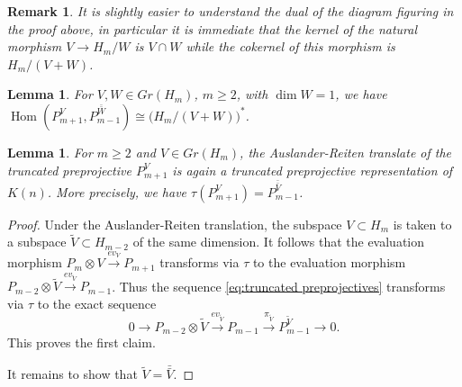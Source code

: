 \documentclass{amsart}
\newtheorem{lemma}[theorem]{Lemma}
\newtheorem{remark}[theorem]{Remark}
\newcommand{\Hom}{\operatorname{Hom}}
\begin{document}
\begin{remark}
  It is slightly easier to understand the dual of the diagram figuring in the proof above, in particular it is immediate that the kernel of the natural morphism $V\to H_m/W$ is $V\cap W$ while the cokernel of this morphism is $H_m/(V+W)$.
\end{remark}

\begin{lemma}
  For $V,W\in Gr(H_m)$, $m\ge2$, with $\dim W=1$, we have $\Hom(P_{m+1}^V,P_{m-1}^{\bar{\bar{W}}})\cong\big(H_m/(V+W)\big)^*$.
\end{lemma}

\begin{lemma}
  For $m\ge2$ and $V\in Gr(H_m)$, the Auslander-Reiten translate of the truncated preprojective $P_{m+1}^V$ is again a truncated preprojective representation of $K(n)$.  More precisely, we have $\tau(P_{m+1}^V)=P_{m-1}^{\bar{\bar{V}}}$.
\end{lemma}
\begin{proof}
  Under the Auslander-Reiten translation, the subspace $V\subset H_m$ is taken to a subspace $\tilde V\subset H_{m-2}$ of the same dimension.
  It follows that the evaluation morphism $P_m\otimes V\stackrel{ev_V}{\longrightarrow} P_{m+1}$ transforms via $\tau$ to the evaluation morphism $P_{m-2}\otimes\tilde V\stackrel{ev_{\tilde V}}{\longrightarrow} P_{m-1}$.
  Thus the sequence \eqref{eq:truncated preprojectives} transforms via $\tau$ to the exact sequence
  \[0\longrightarrow P_{m-2}\otimes \tilde V\stackrel{ev_{\tilde V}}{\longrightarrow} P_{m-1}\stackrel{\pi_{\tilde V}}{\longrightarrow} P_{m-1}^{\tilde V}\longrightarrow 0.\]
  This proves the first claim.

  It remains to show that $\tilde V=\bar{\bar{V}}$.
\end{proof}
\end{document}
